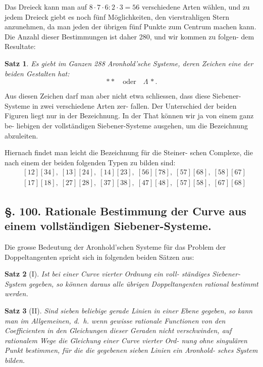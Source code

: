 \documentclass[12pt,a4paper]{article}
\theoremstyle{plain}
\newtheorem{satz}{Satz}[section]
\theoremstyle{definition}
\theoremstyle{remark}
\begin{document}
Das Dreieck kann man auf $8 \cdot 7 \cdot 6 : 2 \cdot 3 = 56$ verschiedene
Arten wählen, und zu jedem Dreieck giebt es noch fünf Möglichkeiten,
den vierstrahligen Stern anzunehmen, da man jeden der
übrigen fünf Punkte zum Centrum machen kann. Die Anzahl
dieser Bestimmungen ist daher 280, und wir kommen zu folgen-
dem Resultate:

\begin{satz}
Es giebt im Ganzen 288 Aronhold'sche Systeme,
deren Zeichen eine der beiden Gestalten hat:
\begin{equation*}\label{eq:99_fig}
\ast\!\!\!\!\!\!\ast \quad \text{oder} \quad \Lambda\,\ast.
\end{equation*}
\end{satz}

Aus diesen Zeichen darf man aber nicht etwa schliessen,
dass diese Siebener-Systeme in zwei verschiedene Arten zer-
fallen. Der Unterschied der beiden Figuren liegt nur in der
Bezeichnung. In der That können wir ja von einem ganz be-
liebigen der vollständigen Siebener-Systeme ausgehen, um die
Bezeichnung abzuleiten.

Hiernach findet man leicht die Bezeichnung für die Steiner-
schen Complexe, die nach einem der beiden folgenden Typen zu
bilden sind:
\begin{align*}
&[12][34], \; [13][24], \; [14][23], \; [56][78], \; [57][68], \; [58][67] \\
&[17][18], \; [27][28], \; [37][38], \; [47][48], \; [57][58], \; [67][68]
\end{align*}

\subsection*{§. 100. Rationale Bestimmung der Curve aus einem vollständigen Siebener-Systeme.}

Die grosse Bedeutung der Aronhold'schen Systeme für das
Problem der Doppeltangenten spricht sich in folgenden beiden
Sätzen aus:

\begin{satz}[I]
Ist bei einer Curve vierter Ordnung ein voll-
ständiges Siebener-System gegeben, so können
daraus alle übrigen Doppeltangenten rational
bestimmt werden.
\end{satz}

\begin{satz}[II]
Sind sieben beliebige gerade Linien in einer
Ebene gegeben, so kann man im Allgemeinen,
d.~h. wenn gewisse rationale Functionen von
den Coefficienten in den Gleichungen dieser
Geraden nicht verschwinden, auf rationalem
Wege die Gleichung einer Curve vierter Ord-
nung ohne singulären Punkt bestimmen, für
die die gegebenen sieben Linien ein Aronhold-
sches System bilden.
\end{satz}
\end{document}
